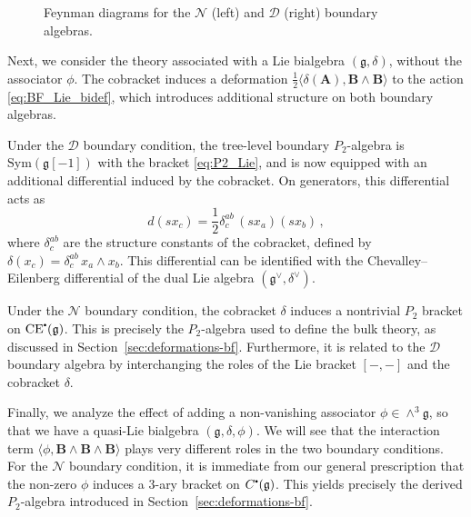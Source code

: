 \documentclass[11pt]{article}
\newcommand\sbullet[1][.5]{\mathbin{\vcenter{\hbox{\scalebox{#1}{$\bullet$}}}}}
\numberwithin{equation}{section}
\begin{document}
\begin{figure}[h]
	\caption{ Feynman diagrams for the $\mathcal{N}$ (left) and $\mathcal{D}$ (right) boundary algebras.}
		\label{fig:DirichletNeumann}
\end{figure}

Next, we consider the theory associated with a Lie bialgebra $(\mathfrak{g},\delta)$, without the associator $\phi$. The cobracket induces a deformation $\frac{1}{2}\langle \delta(\boldsymbol{A}), \boldsymbol{B}\wedge \boldsymbol{B}\rangle$ to the action \eqref{eq:BF_Lie_bidef}, which introduces additional structure on both boundary algebras. 

Under the $\mathcal{D}$ boundary condition, the tree-level boundary $P_2$-algebra is $\mathrm{Sym}(\mathfrak{g}[-1])$ with the bracket \eqref{eq:P2_Lie}, and is now equipped with an additional differential induced by the cobracket. On generators, this differential acts as
\begin{equation}\label{eq:diff_cobracket}
	d(sx_c) = \frac{1}{2}\delta^{ab}_c\, (sx_a)(sx_b)\,,
\end{equation}
where $\delta^{ab}_c$ are the structure constants of the cobracket, defined by $\delta(x_c) = \delta^{ab}_c\, x_a\wedge x_b$. This differential can be identified with the Chevalley--Eilenberg differential of the dual Lie algebra $(\mathfrak{g}^{\vee},\delta^{\vee})$.

Under the $\mathcal{N}$ boundary condition, the cobracket $\delta$ induces a nontrivial $P_2$ bracket on $\mathrm{CE}^{\sbullet}(\mathfrak{g})$. This is precisely the $P_2$-algebra used to define the bulk theory, as discussed in Section~\ref{sec:deformations-bf}. Furthermore, it is related to the $\mathcal{D}$ boundary algebra by interchanging the roles of the Lie bracket $[-,-]$ and the cobracket $\delta$.


Finally, we analyze the effect of adding a non-vanishing associator $\phi \in \wedge^3\mathfrak{g}$, so that we have a quasi-Lie bialgebra $(\mathfrak{g},\delta,\phi)$. We will see that the interaction term $\langle\phi,\boldsymbol{B}\wedge \boldsymbol{B}\wedge \boldsymbol{B}\rangle$ plays very different roles in the two boundary conditions. For the $\mathcal{N}$ boundary condition, it is immediate from our general prescription that the non-zero $\phi$ induces a $3$-ary bracket on $C^{\sbullet}(\mathfrak{g})$. This yields precisely the derived $P_2$-algebra introduced in Section~\ref{sec:deformations-bf}.
\end{document}
